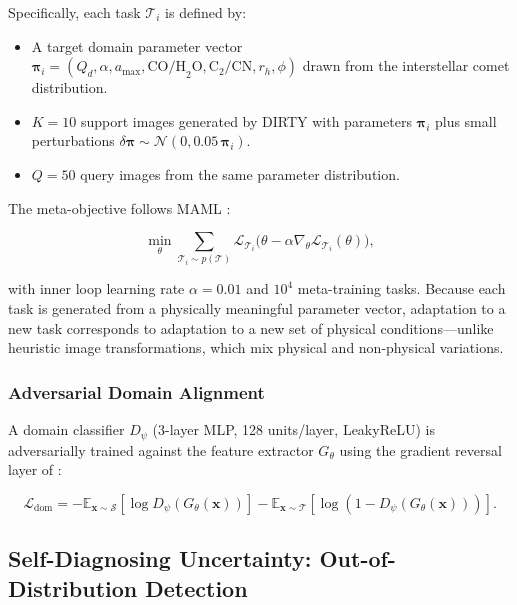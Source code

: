 \documentclass[usenatbib]{mnras}
\begin{document}
Specifically, each task $\mathcal{T}_i$ is defined by:
\begin{itemize}
    \item A target domain parameter vector $\boldsymbol{\pi}_i = (Q_d, \alpha, a_{\max}, \text{CO/H}_2\text{O}, \text{C}_2/\text{CN}, r_h, \phi)$ drawn from the interstellar comet distribution.
    \item $K=10$ support images generated by DIRTY with parameters $\boldsymbol{\pi}_i$ plus small perturbations $\delta\boldsymbol{\pi} \sim \mathcal{N}(0, 0.05\,\boldsymbol{\pi}_i)$.
    \item $Q=50$ query images from the same parameter distribution.
\end{itemize}

The meta-objective follows MAML \citep{finn17}:

\begin{equation}\label{eq:maml}
\min_\theta \sum_{\mathcal{T}_i \sim p(\mathcal{T})}
\mathcal{L}_{\mathcal{T}_i}\bigl(\theta - \alpha \nabla_\theta \mathcal{L}_{\mathcal{T}_i}(\theta)\bigr),
\end{equation}

with inner loop learning rate $\alpha = 0.01$ and $10^4$ meta-training tasks. Because each task is generated from a physically meaningful parameter vector, adaptation to a new task corresponds to adaptation to a new set of physical conditions---unlike heuristic image transformations, which mix physical and non-physical variations.

\subsubsection{Adversarial Domain Alignment}

A domain classifier $D_\psi$ (3-layer MLP, 128 units/layer, LeakyReLU) is adversarially trained against the feature extractor $G_\theta$ using the gradient reversal layer of \citet{ganin16}:

\begin{equation}\label{eq:adv_loss}
\mathcal{L}_{\text{dom}} = -\mathbb{E}_{\mathbf{x}\sim\mathcal{S}}[\log D_\psi(G_\theta(\mathbf{x}))] - \mathbb{E}_{\mathbf{x}\sim\mathcal{T}}[\log(1 - D_\psi(G_\theta(\mathbf{x})))].
\end{equation}

\subsection{Self-Diagnosing Uncertainty: Out-of-Distribution Detection}\label{sec:ood}
\end{document}
